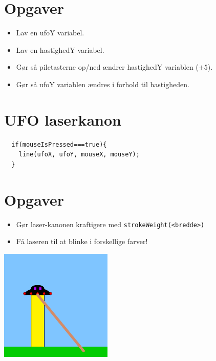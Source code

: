 \documentclass[oneside,a4paper,10pts,article]{memoir}
\begin{document}
\chapter{Opgaver}
\begin{itemize}
\item Lav en ufoY variabel.
\item Lav en hastighedY variabel.
\item Gør så piletasterne op/ned ændrer hastighedY variablen ($\pm5$).
\item Gør så ufoY variablen ændres i forhold til hastigheden.
\end{itemize}

\chapter{UFO laserkanon}
\begin{lstlisting}
  if(mouseIsPressed===true){
    line(ufoX, ufoY, mouseX, mouseY);
  }
\end{lstlisting}

\chapter{Opgaver}
\begin{itemize}
\item Gør laser-kanonen kraftigere med \texttt{strokeWeight(<bredde>)}
\item Få laseren til at blinke i forskellige farver!
\end{itemize}

\hspace{1cm}
\includegraphics[width=0.4\textwidth]{pics/laserkanon.png}
\end{document}

